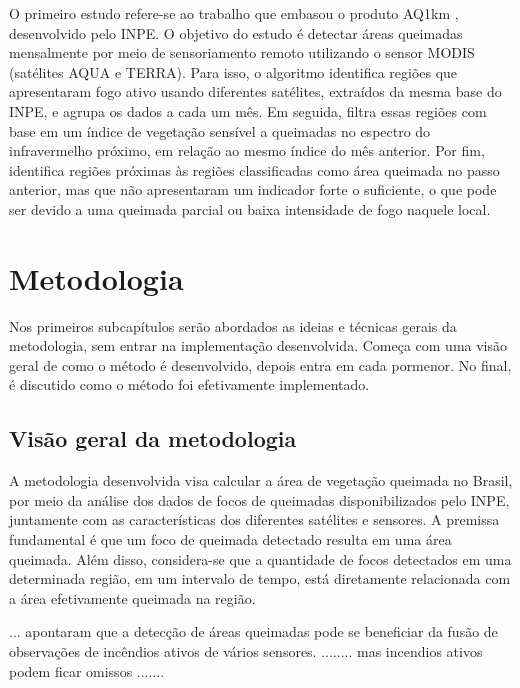 \documentclass[cic,tc]{iiufrgs}
\begin{document}
O primeiro estudo refere-se ao trabalho que embasou o produto AQ1km \citep{libonati2015algorithm}, desenvolvido pelo INPE. O objetivo do estudo é detectar áreas queimadas mensalmente por meio de sensoriamento remoto utilizando o sensor MODIS (satélites AQUA e TERRA). Para isso, o algoritmo identifica regiões que apresentaram fogo ativo usando diferentes satélites, extraídos da mesma base do INPE, e agrupa os dados a cada um mês. Em seguida, filtra essas regiões com base em um índice de vegetação sensível a queimadas no espectro do infravermelho próximo, em relação ao mesmo índice do mês anterior. Por fim, identifica regiões próximas às regiões classificadas como área queimada no passo anterior, mas que não apresentaram um indicador forte o suficiente, o que pode ser devido a uma queimada parcial ou baixa intensidade de fogo naquele local. \par





\chapter{Metodologia}

Nos primeiros subcapítulos serão abordados as ideias e técnicas gerais da metodologia, sem entrar na implementação desenvolvida. Começa com uma visão geral de como o método é desenvolvido, depois entra em cada pormenor. No final, é discutido como o método foi efetivamente implementado.

\section{Visão geral da metodologia}

A metodologia desenvolvida visa calcular a área de vegetação queimada no Brasil, por meio da análise dos dados de focos de queimadas disponibilizados pelo INPE, juntamente com as características dos diferentes satélites e sensores. A premissa fundamental é que um foco de queimada detectado resulta em uma área queimada. Além disso, considera-se que a quantidade de focos detectados em uma determinada região, em um intervalo de tempo, está diretamente relacionada com a área efetivamente queimada na região. \par 

... apontaram que a detecção de áreas queimadas pode se beneficiar da fusão de observações de incêndios ativos de vários sensores. \citep{giglio2010assessing} ........ mas incendios ativos podem ficar omissos \citep{giglio2009active} ....... \par
\end{document}
